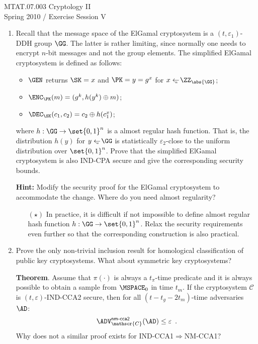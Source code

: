 \documentclass{article}
\newcommand{\PKC}{\mathscr{C}}
\begin{document}
\noindent	
MTAT.07.003 Cryptology II\\
Spring 2010 / Exercise Session V 

\begin{enumerate}

\item Recall that the message space of the ElGamal cryptosystem is a
  $(t,\varepsilon_1)$-DDH group $\GG$. The latter is rather limiting,
  since normally one needs to encrypt $n$-bit messages and not the
  group elements. The simplified ElGamal cryptosystem is defined as
  follows:
  \begin{itemize}
  \item $\GEN$ returns $\SK=x$ and $\PK=y=g^x$ for $x\getsu\ZZ_{\abs{\GG}}$;
  \item $\ENC_\PK(m)=(g^k,h(y^k)\oplus m)$; 
  \item $\DEC_\SK(c_1,c_2)=c_2\oplus h(c_1^x)$;
  \end{itemize}
  where $h:\GG\to\set{0,1}^n$ is a almost regular hash function. That
  is, the distribution $h(y)$ for $y\getsu\GG$ is statistically
  $\varepsilon_2$-close to the uniform distribution over
  $\set{0,1}^n$. Prove that the simplified ElGamal cryptosystem is
  also IND-CPA secure and give the corresponding security bounds.


  \textbf{Hint:} Modify the security proof for the ElGamal
  cryptosystem to accommodate the change. Where do you need almost
  regularity?
  \begin{itemize}
  \item[$(\star)$] In practice, it is difficult if not impossible to
    define almost regular hash function $h:\GG\to\set{0,1}^n$. Relax
    the security requirements even further so that the corresponding
    construction is also practical.
  \end{itemize}




\item Prove the only non-trivial inclusion result for homological
  classification of public key cryptosystems. What about symmetric key
  cryptosystems?  
 
  \textbf{Theorem}. Assume that $\pi(\cdot)$ is always a $t_\pi$-time
  predicate and it is always possible to obtain a sample from
  $\MSPACE_0$ in time $t_m$. If the cryptosystem $\PKC$ is
  $(t,\varepsilon)$-IND-CCA2 secure, then for all $(t-t_g-2t_m)$-time
  adversaries $\AD$:
  \begin{align*}
  \advNMCCAIIXX{\PKC}{\AD}\leq\varepsilon\enspace.
  \end{align*}
  Why does not a similar proof exists for
  IND-CCA1$\Rightarrow$NM-CCA1?


\end{enumerate}
\end{document}
